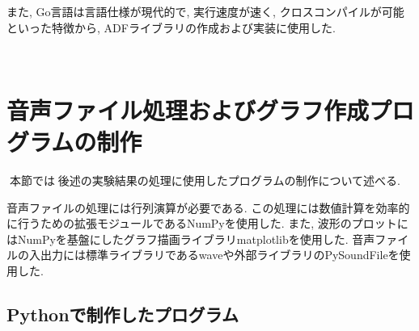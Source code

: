 また, Go言語は言語仕様が現代的で, 実行速度が速く, クロスコンパイルが可能といった特徴から, ADFライブラリの作成および実装に使用した. 



\
\section{音声ファイル処理およびグラフ作成プログラムの制作}\label{create-program}

本節では後述の実験結果の処理に使用したプログラムの制作について述べる. 

音声ファイルの処理には行列演算が必要である. この処理には数値計算を効率的に行うための拡張モジュールであるNumPyを使用した. また, 波形のプロットにはNumPyを基盤にしたグラフ描画ライブラリmatplotlibを使用した. 
音声ファイルの入出力には標準ライブラリであるwaveや外部ライブラリのPySoundFileを使用した. 


\subsection{Pythonで制作したプログラム}\label{python}

